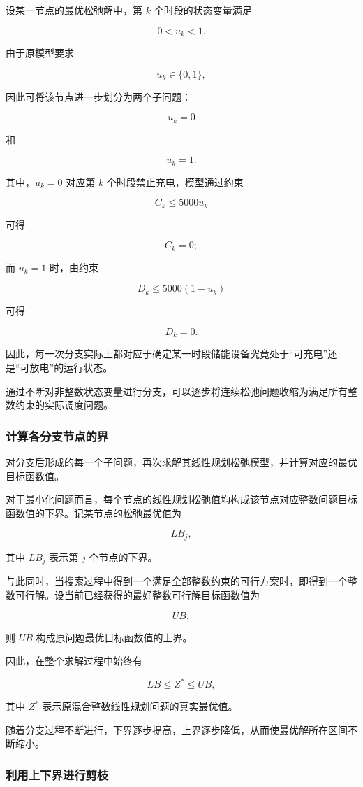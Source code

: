 设某一节点的最优松弛解中，第 \(k\) 个时段的状态变量满足

\[
0<u_k<1.
\]

由于原模型要求

\[
u_k\in\{0,1\},
\]

因此可将该节点进一步划分为两个子问题：

\[
u_k=0
\]

和

\[
u_k=1.
\]

其中，\(u_k=0\) 对应第 \(k\) 个时段禁止充电，模型通过约束

\[
C_k\leq5000u_k
\]

可得

\[
C_k=0;
\]

而 \(u_k=1\) 时，由约束

\[
D_k\leq5000(1-u_k)
\]

可得

\[
D_k=0.
\]

因此，每一次分支实际上都对应于确定某一时段储能设备究竟处于“可充电”还是“可放电”的运行状态。

通过不断对非整数状态变量进行分支，可以逐步将连续松弛问题收缩为满足所有整数约束的实际调度问题。

\subsubsection{计算各分支节点的界}

对分支后形成的每一个子问题，再次求解其线性规划松弛模型，并计算对应的最优目标函数值。

对于最小化问题而言，每个节点的线性规划松弛值均构成该节点对应整数问题目标函数值的下界。记某节点的松弛最优值为

\[
LB_j,
\]

其中 \(LB_j\) 表示第 \(j\) 个节点的下界。

与此同时，当搜索过程中得到一个满足全部整数约束的可行方案时，即得到一个整数可行解。设当前已经获得的最好整数可行解目标函数值为

\[
UB,
\]

则 \(UB\) 构成原问题最优目标函数值的上界。

因此，在整个求解过程中始终有

\[
LB\leq Z^*\leq UB,
\]

其中 \(Z^*\) 表示原混合整数线性规划问题的真实最优值。

随着分支过程不断进行，下界逐步提高，上界逐步降低，从而使最优解所在区间不断缩小。

\subsubsection{利用上下界进行剪枝}


